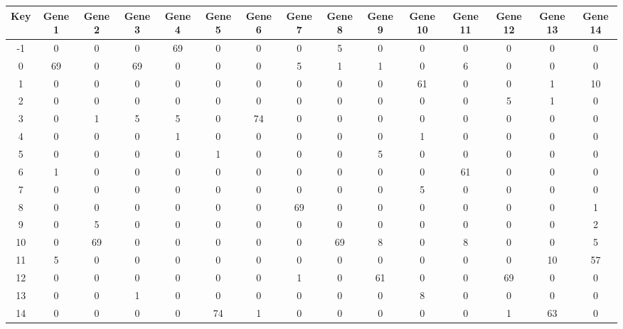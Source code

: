 \begin{tabular}{|c|c|c|c|c|c|c|c|c|c|c|c|c|c|c|}
\hline
Key & Gene 1 & Gene 2 & Gene 3 & Gene 4 & Gene 5 & Gene 6 & Gene 7 & Gene 8 & Gene 9 & Gene 10 & Gene 11 & Gene 12 & Gene 13 & Gene 14 \\
\hline
-1 & 0 & 0 & 0 & 69 & 0 & 0 & 0 & 5 & 0 & 0 & 0 & 0 & 0 & 0 \\
0 & 69 & 0 & 69 & 0 & 0 & 0 & 5 & 1 & 1 & 0 & 6 & 0 & 0 & 0 \\
1 & 0 & 0 & 0 & 0 & 0 & 0 & 0 & 0 & 0 & 61 & 0 & 0 & 1 & 10 \\
2 & 0 & 0 & 0 & 0 & 0 & 0 & 0 & 0 & 0 & 0 & 0 & 5 & 1 & 0 \\
3 & 0 & 1 & 5 & 5 & 0 & 74 & 0 & 0 & 0 & 0 & 0 & 0 & 0 & 0 \\
4 & 0 & 0 & 0 & 1 & 0 & 0 & 0 & 0 & 0 & 1 & 0 & 0 & 0 & 0 \\
5 & 0 & 0 & 0 & 0 & 1 & 0 & 0 & 0 & 5 & 0 & 0 & 0 & 0 & 0 \\
6 & 1 & 0 & 0 & 0 & 0 & 0 & 0 & 0 & 0 & 0 & 61 & 0 & 0 & 0 \\
7 & 0 & 0 & 0 & 0 & 0 & 0 & 0 & 0 & 0 & 5 & 0 & 0 & 0 & 0 \\
8 & 0 & 0 & 0 & 0 & 0 & 0 & 69 & 0 & 0 & 0 & 0 & 0 & 0 & 1 \\
9 & 0 & 5 & 0 & 0 & 0 & 0 & 0 & 0 & 0 & 0 & 0 & 0 & 0 & 2 \\
10 & 0 & 69 & 0 & 0 & 0 & 0 & 0 & 69 & 8 & 0 & 8 & 0 & 0 & 5 \\
11 & 5 & 0 & 0 & 0 & 0 & 0 & 0 & 0 & 0 & 0 & 0 & 0 & 10 & 57 \\
12 & 0 & 0 & 0 & 0 & 0 & 0 & 1 & 0 & 61 & 0 & 0 & 69 & 0 & 0 \\
13 & 0 & 0 & 1 & 0 & 0 & 0 & 0 & 0 & 0 & 8 & 0 & 0 & 0 & 0 \\
14 & 0 & 0 & 0 & 0 & 74 & 1 & 0 & 0 & 0 & 0 & 0 & 1 & 63 & 0 \\
\hline
\end{tabular}